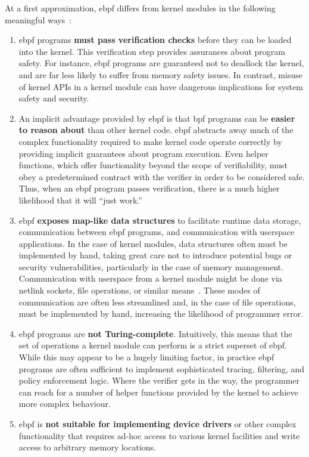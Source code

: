 At a first approximation, \gls{ebpf} differs from kernel modules in the following meaningful ways~\cite{gregg2019_bpf}:
\begin{enumerate}
  \item \gls{ebpf} programs \textbf{must pass verification checks} before they can be loaded into the
  kernel. This verification step provides assurances about program safety. For instance, \gls{ebpf}
  programs are guaranteed not to deadlock the kernel, and are far less likely to suffer from
  memory safety issues. In contrast, misuse of kernel APIs in a kernel module can have dangerous
  implications for system safety and security.

  \item An implicit advantage provided by \gls{ebpf} is that \gls{bpf} programs can be \textbf{easier
  to reason about} than other kernel code. \gls{ebpf} abstracts away much of the complex
  functionality required to make kernel code operate correctly by providing implicit
  guarantees about program execution. Even helper functions, which offer functionality
  beyond the scope of verifiability, must obey a predetermined contract with the verifier
  in order to be considered safe. Thus, when an \gls{ebpf} program passes verification, there is
  a much higher likelihood that it will \enquote{just work.}

  \item \gls{ebpf} \textbf{exposes map-like data structures} to facilitate runtime data storage,
  communication between \gls{ebpf} programs, and communication with userspace applications. In
  the case of kernel modules, data structures often must be implemented by hand, taking
  great care not to introduce potential bugs or security vulnerabilities, particularly in
  the case of memory management. Communication with userspace from a kernel module might
  be done via netlink sockets, file operations, or similar
  means~\cite{corbet1998_device_drivers}. These modes of communication are often less
  streamlined and, in the case of file operations, must be implemented by hand, increasing
  the likelihood of programmer error.

  \item \gls{ebpf} programs are \textbf{not Turing-complete}. Intuitively, this means that
  the set of operations a kernel module can perform is a strict superset of \gls{ebpf}. While
  this may appear to be a hugely limiting factor, in practice \gls{ebpf} programs are often
  sufficient to implement sophisticated tracing, filtering, and policy enforcement logic.
  Where the verifier gets in the way, the programmer can reach for a number of helper
  functions provided by the kernel to achieve more complex behaviour.

  \item \gls{ebpf} is \textbf{not suitable for implementing device drivers} or other complex
  functionality that requires ad-hoc access to various kernel facilities and write access
  to arbitrary memory locations.
\end{enumerate}

